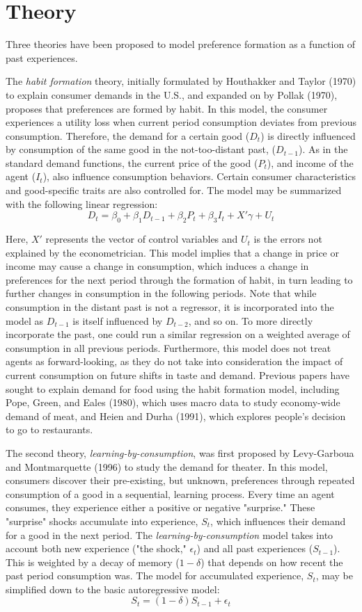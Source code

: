 \documentclass[Journal,letterpaper, NoLineNumbers]{ascelike-new}
\begin{document}
\section{Theory}
Three theories have been proposed to model preference formation as a function of past experiences.

The \textit{habit formation} theory, initially formulated by Houthakker and Taylor (1970) to explain consumer demands in the U.S., and expanded on by Pollak (1970), proposes that preferences are formed by habit. In this model, the consumer experiences a utility loss when current period consumption deviates from previous consumption. Therefore, the demand for a certain good ($D_{t}$) is directly influenced by consumption of the same good in the not-too-distant past, ($D_{t-1}$). As in the standard demand functions, the current price of the good ($P_{t}$), and income of the agent ($I_{t}$), also influence consumption behaviors. Certain consumer characteristics and good-specific traits are also controlled for. The model may be summarized with the following linear regression:
\[D_{t} = \beta_0 + \beta_1D_{t-1} + \beta_2P_{t} + \beta_3I_{t} + X'\gamma + U_t\]

Here, $X'$ represents the vector of control variables and $U_t$ is the errors not explained by the econometrician.  This model implies that a change in price or income may cause a change in consumption, which induces a change in preferences for the next period through the formation of habit, in turn leading to further changes in consumption in the following periods. Note that while consumption in the distant past is not a regressor, it is incorporated into the model as $D_{t-1}$ is itself influenced by $D_{t-2}$, and so on. To more directly incorporate the past, one could run a similar regression on a weighted average of consumption in all previous periods. Furthermore, this model does not treat agents as forward-looking, as they do not take into consideration the impact of current consumption on future shifts in taste and demand. Previous papers have sought to explain demand for food using the habit formation model, including Pope, Green, and Eales (1980), which uses macro data to study economy-wide demand of meat, and Heien and Durha (1991), which explores people's decision to go to restaurants.  

The second theory, \textit{learning-by-consumption}, was first proposed by Levy-Garboua and Montmarquette (1996) to study the demand for theater. In this model, consumers discover their pre-existing, but unknown, preferences through repeated consumption of a good in a sequential, learning process. Every time an agent consumes, they experience either a positive or negative "surprise." These "surprise" shocks accumulate into experience, $S_t$, which influences their demand for a good in the next period. The \textit{learning-by-consumption} model takes into account both new experience ("the shock," $\epsilon_t$) and all past experiences ($S_{t-1}$). This is weighted by a decay of memory ($1-\delta$) that depends on how recent the past period consumption was. The model for accumulated experience, $S_t$, may be simplified down to the basic autoregressive model:
\[S_t = (1-\delta)S_{t-1} + \epsilon_t\]
\end{document}
